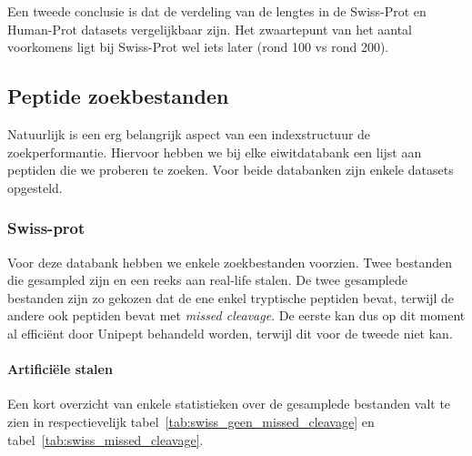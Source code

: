 \documentclass[11pt,dutch,faculty=we,layout=titlefont,underline=false,titleUppercase=true,titleUnderline=true]{ugent2016-report}
\begin{document}
    Een tweede conclusie is dat de verdeling van de lengtes in de Swiss-Prot en Human-Prot datasets vergelijkbaar zijn.
    Het zwaartepunt van het aantal voorkomens ligt bij Swiss-Prot wel iets later (rond 100 vs rond 200).

    \subsection{Peptide zoekbestanden}\label{subsec:peptide-zoek-bestanden}
    Natuurlijk is een erg belangrijk aspect van een indexstructuur de zoekperformantie.
    Hiervoor hebben we bij elke eiwitdatabank een lijst aan peptiden die we proberen te zoeken.
    Voor beide databanken zijn enkele datasets opgesteld.

    \subsubsection{Swiss-prot}
    Voor deze databank hebben we enkele zoekbestanden voorzien.
    Twee bestanden die gesampled zijn en een reeks aan real-life stalen.
    De twee gesamplede bestanden zijn zo gekozen dat de ene enkel tryptische peptiden bevat, terwijl de andere ook peptiden bevat met \textit{missed cleavage}.
    De eerste kan dus op dit moment al efficiënt door Unipept behandeld worden, terwijl dit voor de tweede niet kan.

    \paragraph{Artificiële stalen}
    Een kort overzicht van enkele statistieken over de gesamplede bestanden valt te zien in respectievelijk tabel~\ref{tab:swiss_geen_missed_cleavage} en tabel~\ref{tab:swiss_missed_cleavage}.
\end{document}
